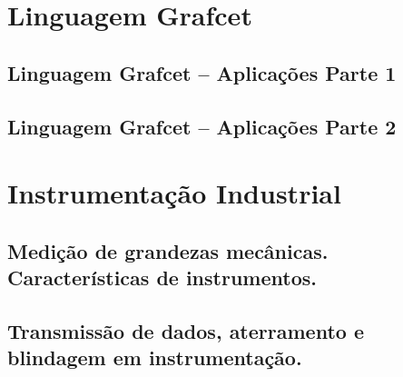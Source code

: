 \documentclass[12pt,oneside]{report}
\begin{document}
\chapter{Linguagem Grafcet}
\section{Linguagem Grafcet – Aplicações Parte 1}
\section{Linguagem Grafcet – Aplicações Parte 2}
\chapter{Instrumentação Industrial}
\section{Medição de grandezas mecânicas. Características de instrumentos.}
\section{Transmissão de dados, aterramento e blindagem em instrumentação.}
\end{document}
